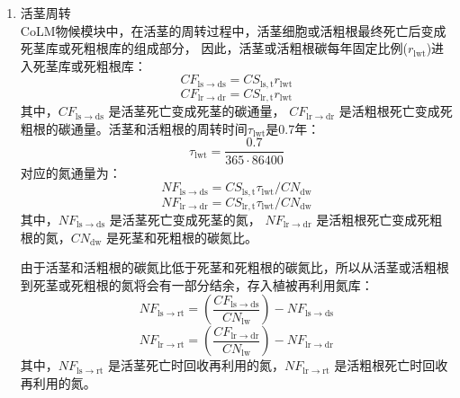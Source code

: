 \begin{enumerate}
  \item 活茎周转\\
    CoLM物候模块中，在活茎的周转过程中，活茎细胞或活粗根最终死亡后变成死茎库或死粗根库的组成部分，
    因此，活茎或活粗根碳每年固定比例($r_{\mathrm{lwt}}$)进入死茎库或死粗根库：
    \begin{equation}
      CF_{\mathrm{ {ls\rightarrow ds }}} = CS_{\mathrm{ {ls,t }}} r_{\mathrm{lwt}}
    \end{equation}
    \begin{equation}
      CF_{\mathrm{ {lr\rightarrow dr }}} = CS_{\mathrm{ {lr,t }}} r_{\mathrm{lwt}}
    \end{equation}
    其中，$CF_{\mathrm{ls\rightarrow ds}}$ 是活茎死亡变成死茎的碳通量，
    $CF_{\mathrm{lr\rightarrow dr}}$ 是活粗根死亡变成死粗根的碳通量。活茎和活粗根的周转时间$\tau_{\mathrm{lwt}}$是0.7年：
    \begin{equation}
      \tau_{\mathrm{lwt}} = \frac{0.7}{365 \cdot 86400}
    \end{equation}
    对应的氮通量为：
    \begin{equation}
      NF_{\mathrm{ls\rightarrow ds}} = CS_{\mathrm{ls,t}} \tau_{\mathrm{lwt}} / CN_{\mathrm{dw}}
    \end{equation}
    \begin{equation}
      NF_{\mathrm{lr\rightarrow dr}} = CS_{\mathrm{lr,t}} \tau_{\mathrm{lwt}} / CN_{\mathrm{dw}}
    \end{equation}
    其中，$NF_{\mathrm{ls\rightarrow ds}}$ 是活茎死亡变成死茎的氮，
    $NF_{\mathrm{lr\rightarrow dr}}$ 是活粗根死亡变成死粗根的氮，$CN_{\mathrm{dw}}$ 是死茎和死粗根的碳氮比。

    由于活茎和活粗根的碳氮比低于死茎和死粗根的碳氮比，所以从活茎或活粗根到死茎或死粗根的氮将会有一部分结余，存入植被再利用氮库：
    \begin{equation}
      NF_{\mathrm{{ls\rightarrow rt}}}=\left(\frac{CF_{\mathrm{{ls\rightarrow ds}}}}{CN_{\mathrm{lw}}}\right)-NF_{\mathrm{{ls\rightarrow ds}}}
    \end{equation}
    \begin{equation}
      NF_{\mathrm{{lr\rightarrow rt}}}=\left(\frac{CF_{\mathrm{{lr\rightarrow dr}}}}{CN_{\mathrm{lw}}}\right)-NF_{\mathrm{{lr\rightarrow dr}}}
    \end{equation}
    其中，$NF_{\mathrm{ls\rightarrow rt}}$ 是活茎死亡时回收再利用的氮，$NF_{\mathrm{lr\rightarrow rt}}$ 是活粗根死亡时回收再利用的氮。

\end{enumerate}


